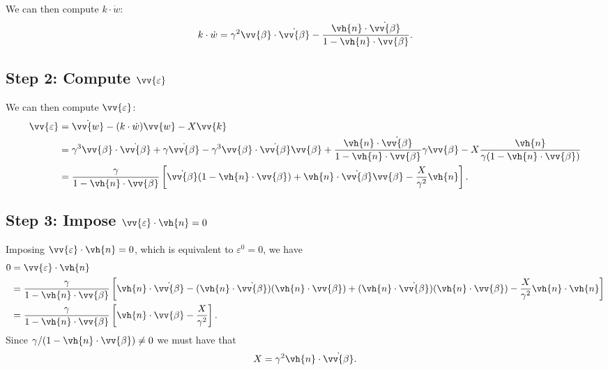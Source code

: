 \documentclass[fleqn]{NotesClass}
\begin{document}
    We can then compute \(k \cdot \dot{w}\):
    \begin{equation}
        k \cdot \dot{w} = \gamma^2 \vv{\beta} \cdot \dot{\vv{\beta}} - \frac{\vh{n} \cdot \dot{\vv{\beta}}}{1 - \vh{n} \cdot \vv{\beta}}.
    \end{equation}
    
    \subsection{Step 2: Compute \texorpdfstring{\(\vv{\varepsilon}\)}{epsilon vector}}
    We can then compute \(\vv{\varepsilon}\):
    \begin{align}
        \vv{\varepsilon} &= \dot{\vv{w}} - (k \cdot \dot{w}) \vv{w} - X \vv{k}\\
        &= \gamma^3 \vv{\beta} \cdot \dot{\vv{\beta}} + \gamma \dot{\vv{\beta}} - \gamma^3 \vv{\beta} \cdot \dot{\vv{\beta}} \vv{\beta} + \frac{\vh{n} \cdot \dot{\vv{\beta}}}{1 - \vh{n} \cdot \vv{\beta}} \gamma \vv{\beta} - X \frac{\vh{n}}{\gamma(1 - \vh{n} \cdot \vv{\beta})}\\
        &= \frac{\gamma}{1 - \vh{n} \cdot \vv{\beta}} \left[ \dot{\vv{\beta}} (1 - \vh{n} \cdot \vv{\beta}) + \vh{n} \cdot \dot{\vv{\beta}} \vv{\beta} - \frac{X}{\gamma^2}\vh{n} \right].
    \end{align}
    
    \subsection{Step 3: Impose \texorpdfstring{\(\vv{\varepsilon} \cdot \vh{n} = 0\)}{epsilon dot n-hat = 0}}
    Imposing \(\vv{\varepsilon} \cdot \vh{n} = 0\), which is equivalent to \(\varepsilon^0 = 0\), we have
    \begin{align}
        0 &= \vv{\varepsilon} \cdot \vh{n}\\
        &= \frac{\gamma}{1 - \vh{n} \cdot \vv{\beta}} \left[ \vh{n} \cdot \dot{\vv{\beta}} - (\vh{n} \cdot \dot{\vv{\beta}})(\vh{n} \cdot \vv{\beta}) + (\vh{n} \cdot \dot{\vv{\beta}})(\vh{n} \cdot \vv{\beta}) - \frac{X}{\gamma^2} \vh{n} \cdot \vh{n} \right]\\
        &= \frac{\gamma}{1 - \vh{n} \cdot \vv{\beta}} \left[ \vh{n} \cdot \vv{\beta} - \frac{X}{\gamma^2} \right].
    \end{align}
    Since \(\gamma/(1 - \vh{n} \cdot \vv{\beta}) \ne 0\) we must have that
    \begin{equation}
        X = \gamma^2 \vh{n} \cdot \dot{\vv{\beta}}.
    \end{equation}
    
\end{document}
